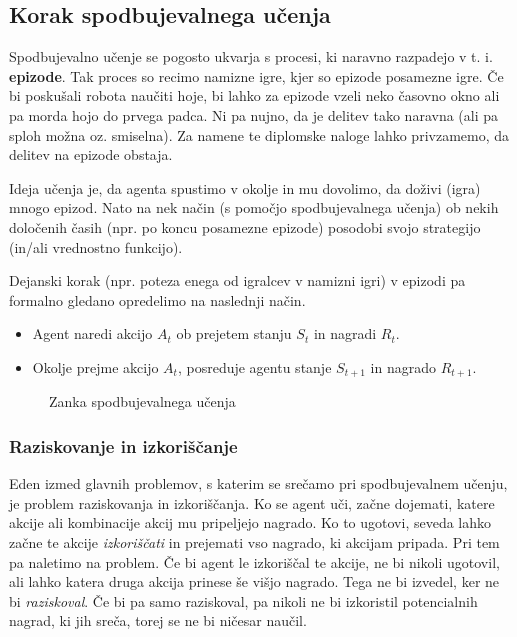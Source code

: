 \documentclass[12pt,a4paper]{amsart}
\theoremstyle{definition} %
\theoremstyle{plain} %
\begin{document}
\subsection{Korak spodbujevalnega učenja}
Spodbujevalno učenje se pogosto ukvarja s procesi, ki naravno razpadejo v t. i. \textbf{epizode}. 
Tak proces so recimo namizne igre, kjer so epizode posamezne igre. Če bi poskušali 
robota naučiti hoje, bi lahko za epizode vzeli neko časovno okno ali pa morda hojo do prvega padca.
Ni pa nujno, da je delitev tako naravna (ali pa sploh možna oz. smiselna). Za namene te diplomske 
naloge lahko privzamemo, da delitev na epizode obstaja.

Ideja učenja je, da agenta spustimo v okolje in mu dovolimo, da doživi (igra) mnogo epizod. Nato 
na nek način (s pomočjo spodbujevalnega učenja) ob nekih določenih časih (npr. po koncu posamezne 
epizode) posodobi svojo strategijo (in/ali vrednostno funkcijo). 

Dejanski korak (npr. poteza enega od igralcev v namizni igri) v epizodi pa formalno gledano opredelimo
 na naslednji način.
\begin{itemize}
    \item Agent naredi akcijo $A_t$ ob prejetem stanju $S_t$ in nagradi $R_t$.
    \item Okolje prejme akcijo $A_t$, posreduje agentu stanje $S_{t+1}$ in nagrado $R_{t+1}$.
\end{itemize}
\begin{center}
    \begin{figure}[h]
    \caption{Zanka spodbujevalnega učenja}
    \end{figure}
\end{center}
\subsubsection{Raziskovanje in izkoriščanje}
Eden izmed glavnih problemov, s katerim se srečamo pri spodbujevalnem učenju, je problem 
raziskovanja in izkoriščanja. Ko se agent uči, začne dojemati, katere akcije ali kombinacije 
akcij mu pripeljejo nagrado. Ko to ugotovi, seveda lahko začne te akcije \textit{izkoriščati} in 
prejemati vso nagrado, ki akcijam pripada. Pri tem pa naletimo na problem. Če bi agent le izkoriščal 
te akcije, ne bi nikoli ugotovil, ali lahko katera druga akcija prinese še višjo nagrado. Tega ne bi 
izvedel, ker ne bi \textit{raziskoval}. Če bi pa samo raziskoval, pa nikoli ne bi izkoristil potencialnih
 nagrad, ki jih sreča, torej se ne bi ničesar naučil.
\end{document}
